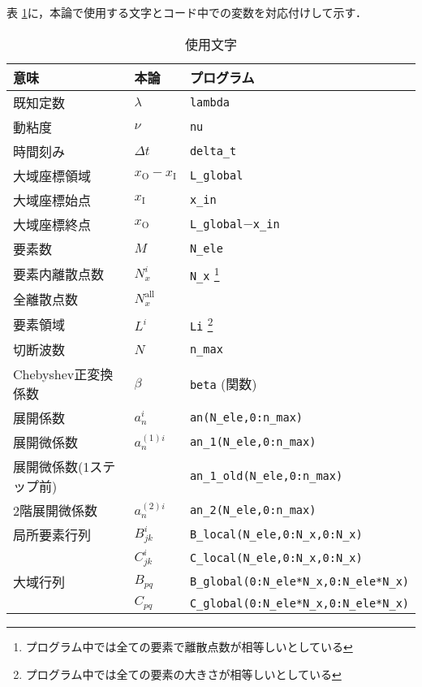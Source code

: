 \documentclass[12pt,a4paper]{jsarticle}
\begin{document}
表 \ref{tab:words}に，本論で使用する文字とコード中での変数を対応付けして示す．
\begin{longtable}{lll}
  \caption[表目次用のキャプション]{使用文字\label{tab:words}}\\ \hline
    意味 & 本論 & プログラム \\ \hline\hline
    既知定数      & $\lambda$ & \texttt{lambda} \\ \hline
    動粘度       & $\nu$ & \texttt{nu} \\ \hline
    時間刻み      & $\Delta t$ & \texttt{delta\_t} \\ \hline
    大域座標領域  & $x_{\text{O}}-x_{\text{I}}$ & \texttt{L\_global} \\ \hline
    大域座標始点  & $x_{\text{I}}$ & \texttt{x\_{in}} \\ \hline
    大域座標終点  & $x_{\text{O}}$ & \texttt{L\_global}$-$\texttt{x\_{in}} \\ \hline
    要素数        & $M$ & \texttt{N\_ele} \\ \hline
    要素内離散点数 & $N_{x}^i$ & \texttt{N\_x} \footnote{プログラム中では全ての要素で離散点数が相等しいとしている} \\ \hline
    全離散点数    & $N_{x}^\text{all}$ &  \\ \hline
    要素領域      & $L^i$ & \texttt{Li}  \footnote{プログラム中では全ての要素の大きさが相等しいとしている} \\ \hline
    切断波数      & $N$ & \texttt{n\_max} \\ \hline
    Chebyshev正変換係数 & $\beta$ & \texttt{beta} (関数) \\ \hline
    展開係数      & $a_{n}^i$ & \texttt{an(N\_ele,0:n\_max)} \\ \hline
    展開微係数    & $a_{n}^{(1)i}$ & \texttt{an\_1(N\_ele,0:n\_max)} \\ \hline
    展開微係数(1ステップ前) &  & \texttt{an\_1\_old(N\_ele,0:n\_max)} \\ \hline
    2階展開微係数  & $a_{n}^{(2)i}$ & \texttt{an\_2(N\_ele,0:n\_max)} \\ \hline
    局所要素行列  & $B_{jk}^i$ & \texttt{B\_local(N\_ele,0:N\_x,0:N\_x)} \\ \hline
    & $C_{jk}^i$ & \texttt{C\_local(N\_ele,0:N\_x,0:N\_x)} \\ \hline
    大域行列     & $B_{pq}$ & \texttt{B\_global(0:N\_ele*N\_x,0:N\_ele*N\_x)} \\ \hline
    & $C_{pq}$ & \texttt{C\_global(0:N\_ele*N\_x,0:N\_ele*N\_x)} \\ \hline

\end{longtable}
\end{document}
